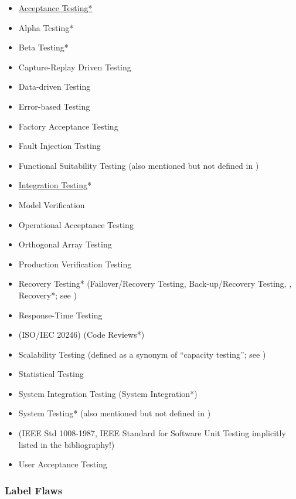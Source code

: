    \begin{itemize}
        \item \underline{Acceptance Testing*}
        \item Alpha Testing*
        \item Beta Testing*
        \item Capture-Replay Driven Testing
        \item Data-driven Testing
        \item Error-based Testing
        \item Factory Acceptance Testing
        \item Fault Injection Testing
        \item Functional Suitability Testing (also mentioned but not defined in
              \citep{IEEE2017})
        \item \underline{Integration Testing}*
        \item Model Verification
        \item Operational Acceptance Testing
        \item Orthogonal Array Testing
        \item Production Verification Testing
        \item Recovery Testing* (Failover/Recovery Testing, Back-up/Recovery
              Testing, ,
              Recovery*; see )
        \item Response-Time Testing
        \item {} (ISO/IEC 20246) (Code Reviews*)
        \item Scalability Testing (defined as a synonym of ``capacity
              testing''; see )
        \item Statistical Testing
        \item System Integration Testing (System Integration*)
        \item System Testing* (also mentioned but not defined in \citep{IEEE2013})
        \item {}
              (IEEE Std 1008-1987, IEEE Standard for
              Software Unit Testing implicitly listed in the bibliography!)
        \item User Acceptance Testing
    \end{itemize}
\fi

\subsubsection{Label Flaws}\label{labels}


